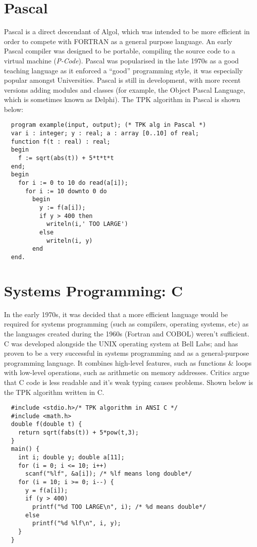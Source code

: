\section{Pascal}
Pascal is a direct descendant of Algol, which was intended to be more efficient in order to compete with FORTRAN as a general purpose language. An early Pascal compiler was designed to be portable, compiling the source code to a virtual machine (\textit{P-Code}). Pascal was popularised in the late 1970s as a good teaching language as it enforced a ``good'' programming style, it was especially popular amongst Universities. Pascal is still in development, with more recent versions adding modules and classes (for example, the Object Pascal Language, which is sometimes known as Delphi). The TPK algorithm in Pascal is shown below:
\begin{verbatim}
  program example(input, output); (* TPK alg in Pascal *)
  var i : integer; y : real; a : array [0..10] of real;
  function f(t : real) : real;
  begin
    f := sqrt(abs(t)) + 5*t*t*t
  end;
  begin
    for i := 0 to 10 do read(a[i]);
      for i := 10 downto 0 do
        begin
          y := f(a[i]);
          if y > 400 then
            writeln(i,' TOO LARGE')
          else
            writeln(i, y)
        end
  end.
\end{verbatim}

\section{Systems Programming: C}
In the early 1970s, it was decided that a more efficient language would be required for systems programming (such as compilers, operating systems, etc) as the languages created during the 1960s (Fortran and COBOL) weren't sufficient. C was developed alongside the UNIX operating system at Bell Labs; and has proven to be a very successful in systems programming and as a general-purpose programming language. It combines high-level features, such as functions \& loops with low-level operations, such as arithmetic on memory addresses. Critics argue that C code is less readable and it's weak typing causes problems. Shown below is the TPK algorithm written in C.
\begin{verbatim}
  #include <stdio.h>/* TPK algorithm in ANSI C */
  #include <math.h>
  double f(double t) {
    return sqrt(fabs(t)) + 5*pow(t,3);
  }
  main() {
    int i; double y; double a[11];
    for (i = 0; i <= 10; i++)
      scanf("%lf", &a[i]); /* %lf means long double*/
    for (i = 10; i >= 0; i--) {
      y = f(a[i]);
      if (y > 400)
        printf("%d TOO LARGE\n", i); /* %d means double*/
      else
        printf("%d %lf\n", i, y);
    }
  }
\end{verbatim}

